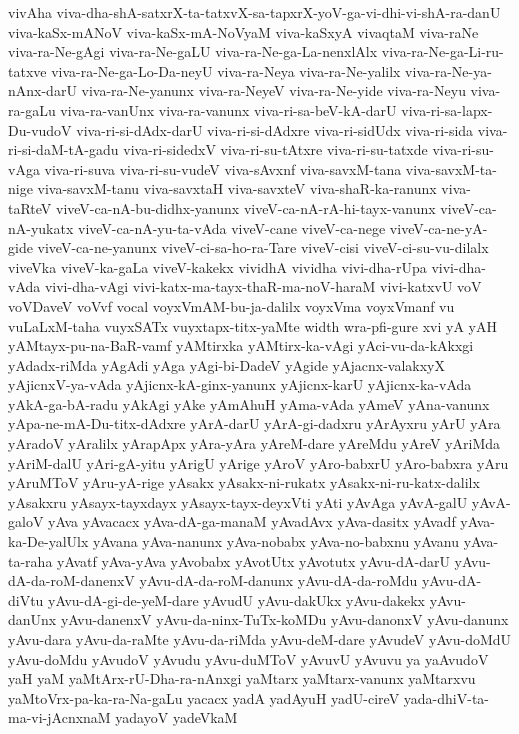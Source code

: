 {vivAha
viva-dha-shA-satxrX-ta-tatxvX-sa-tapxrX-yoV-ga-vi-dhi-vi-shA-ra-danU
viva-kaSx-mANoV
viva-kaSx-mA-NoVyaM
viva-kaSxyA
vivaqtaM
viva-raNe
viva-ra-Ne-gAgi
viva-ra-Ne-gaLU
viva-ra-Ne-ga-La-nenxlAlx
viva-ra-Ne-ga-Li-ru-tatxve
viva-ra-Ne-ga-Lo-Da-neyU
viva-ra-Neya
viva-ra-Ne-yalilx
viva-ra-Ne-ya-nAnx-darU
viva-ra-Ne-yanunx
viva-ra-NeyeV
viva-ra-Ne-yide
viva-ra-Neyu
viva-ra-gaLu
viva-ra-vanUnx
viva-ra-vanunx
viva-ri-sa-beV-kA-darU
viva-ri-sa-lapx-Du-vudoV
viva-ri-si-dAdx-darU
viva-ri-si-dAdxre
viva-ri-sidUdx
viva-ri-sida
viva-ri-si-daM-tA-gadu
viva-ri-sidedxV
viva-ri-su-tAtxre
viva-ri-su-tatxde
viva-ri-su-vAga
viva-ri-suva
viva-ri-su-vudeV
viva-sAvxnf
viva-savxM-tana
viva-savxM-ta-nige
viva-savxM-tanu
viva-savxtaH
viva-savxteV
viva-shaR-ka-ranunx
viva-taRteV
viveV-ca-nA-bu-didhx-yanunx
viveV-ca-nA-rA-hi-tayx-vanunx
viveV-ca-nA-yukatx
viveV-ca-nA-yu-ta-vAda
viveV-cane
viveV-ca-nege
viveV-ca-ne-yA-gide
viveV-ca-ne-yanunx
viveV-ci-sa-ho-ra-Tare
viveV-cisi
viveV-ci-su-vu-dilalx
viveVka
viveV-ka-gaLa
viveV-kakekx
vividhA
vividha
vivi-dha-rUpa
vivi-dha-vAda
vivi-dha-vAgi
vivi-katx-ma-tayx-thaR-ma-noV-haraM
vivi-katxvU
voV
voVDaveV
voVvf
vocal
voyxVmAM-bu-ja-dalilx
voyxVma
voyxVmanf
vu
vuLaLxM-taha
vuyxSATx
vuyxtapx-titx-yaMte
width
wra-pfi-gure
xvi
yA
yAH
yAMtayx-pu-na-BaR-vamf
yAMtirxka
yAMtirx-ka-vAgi
yAci-vu-da-kAkxgi
yAdadx-riMda
yAgAdi
yAga
yAgi-bi-DadeV
yAgide
yAjacnx-valakxyX
yAjicnxV-ya-vAda
yAjicnx-kA-ginx-yanunx
yAjicnx-karU
yAjicnx-ka-vAda
yAkA-ga-bA-radu
yAkAgi
yAke
yAmAhuH
yAma-vAda
yAmeV
yAna-vanunx
yApa-ne-mA-Du-titx-dAdxre
yArA-darU
yArA-gi-dadxru
yArAyxru
yArU
yAra
yAradoV
yAralilx
yArapApx
yAra-yAra
yAreM-dare
yAreMdu
yAreV
yAriMda
yAriM-dalU
yAri-gA-yitu
yArigU
yArige
yAroV
yAro-babxrU
yAro-babxra
yAru
yAruMToV
yAru-yA-rige
yAsakx
yAsakx-ni-rukatx
yAsakx-ni-ru-katx-dalilx
yAsakxru
yAsayx-tayxdayx
yAsayx-tayx-deyxVti
yAti
yAvAga
yAvA-galU
yAvA-galoV
yAva
yAvacacx
yAva-dA-ga-manaM
yAvadAvx
yAva-dasitx
yAvadf
yAva-ka-De-yalUlx
yAvana
yAva-nanunx
yAva-nobabx
yAva-no-babxnu
yAvanu
yAva-ta-raha
yAvatf
yAva-yAva
yAvobabx
yAvotUtx
yAvotutx
yAvu-dA-darU
yAvu-dA-da-roM-danenxV
yAvu-dA-da-roM-danunx
yAvu-dA-da-roMdu
yAvu-dA-diVtu
yAvu-dA-gi-de-yeM-dare
yAvudU
yAvu-dakUkx
yAvu-dakekx
yAvu-danUnx
yAvu-danenxV
yAvu-da-ninx-TuTx-koMDu
yAvu-danonxV
yAvu-danunx
yAvu-dara
yAvu-da-raMte
yAvu-da-riMda
yAvu-deM-dare
yAvudeV
yAvu-doMdU
yAvu-doMdu
yAvudoV
yAvudu
yAvu-duMToV
yAvuvU
yAvuvu
ya
yaAvudoV
yaH
yaM
yaMtArx-rU-Dha-ra-nAnxgi
yaMtarx
yaMtarx-vanunx
yaMtarxvu
yaMtoVrx-pa-ka-ra-Na-gaLu
yacacx
yadA
yadAyuH
yadU-cireV
yada-dhiV-ta-ma-vi-jAcnxnaM
yadayoV
yadeVkaM
}
